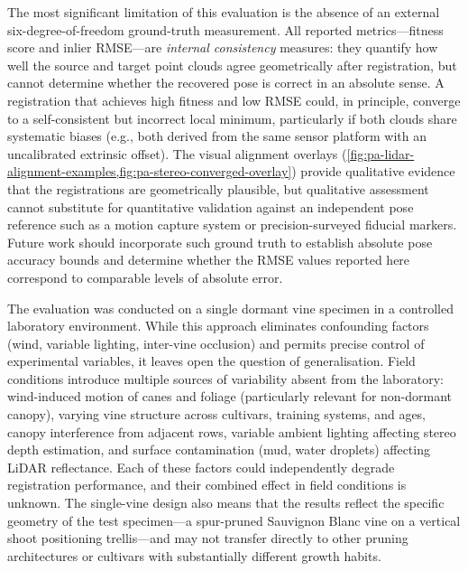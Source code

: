 The most significant limitation of this evaluation is the absence of an external six-degree-of-freedom ground-truth measurement. All reported metrics---fitness score and inlier RMSE---are \emph{internal consistency} measures: they quantify how well the source and target point clouds agree geometrically after registration, but cannot determine whether the recovered pose is correct in an absolute sense. A registration that achieves high fitness and low RMSE could, in principle, converge to a self-consistent but incorrect local minimum, particularly if both clouds share systematic biases (e.g., both derived from the same sensor platform with an uncalibrated extrinsic offset). The visual alignment overlays (\cref{fig:pa-lidar-alignment-examples,fig:pa-stereo-converged-overlay}) provide qualitative evidence that the registrations are geometrically plausible, but qualitative assessment cannot substitute for quantitative validation against an independent pose reference such as a motion capture system or precision-surveyed fiducial markers. Future work should incorporate such ground truth to establish absolute pose accuracy bounds and determine whether the RMSE values reported here correspond to comparable levels of absolute error.

The evaluation was conducted on a single dormant vine specimen in a controlled laboratory environment. While this approach eliminates confounding factors (wind, variable lighting, inter-vine occlusion) and permits precise control of experimental variables, it leaves open the question of generalisation. Field conditions introduce multiple sources of variability absent from the laboratory: wind-induced motion of canes and foliage (particularly relevant for non-dormant canopy), varying vine structure across cultivars, training systems, and ages, canopy interference from adjacent rows, variable ambient lighting affecting stereo depth estimation, and surface contamination (mud, water droplets) affecting LiDAR reflectance. Each of these factors could independently degrade registration performance, and their combined effect in field conditions is unknown. The single-vine design also means that the results reflect the specific geometry of the test specimen---a spur-pruned Sauvignon Blanc vine on a vertical shoot positioning trellis---and may not transfer directly to other pruning architectures or cultivars with substantially different growth habits.

